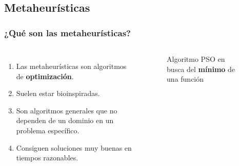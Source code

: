 \subsection{Metaheurísticas}
\begin{frame}
  \frametitle{¿Qué son las metaheurísticas?}
  \begin{columns}
    \begin{enumerate}
      \item Las metaheurísticas son algoritmos de \textbf{optimización}.
      \item Suelen estar bioinspiradas.
      \item Son algoritmos generales que no dependen de un dominio en un problema específico.
      \item Consiguen soluciones muy buenas en tiempos razonables.
    \end{enumerate}
    \begin{figure}
      \begin{center}
      \end{center}
      \caption{Algoritmo PSO en busca del \textbf{mínimo} de una función\footnotemark[2]}
    \end{figure}
  \end{columns}
\end{frame}

\note{

}

